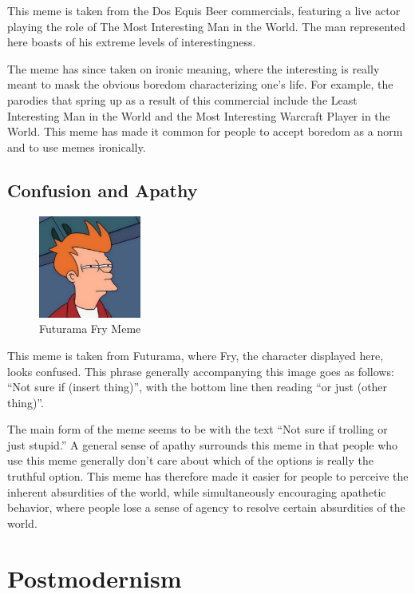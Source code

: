 \documentclass[12pt,letterpaper]{article}
\begin{document}
This meme is taken from the Dos Equis Beer commercials, featuring a live actor playing the role of The Most Interesting Man in the World. The man represented here boasts of his extreme levels of interestingness. 

The meme has since taken on ironic meaning, where the interesting is really meant to mask the obvious boredom characterizing one's life.  For example, the parodies that spring up as a result of this commercial include the Least Interesting Man in the World and the Most Interesting Warcraft Player in the World.  This meme has made it common for people to accept boredom as a norm and to use memes ironically.

\subsection{Confusion and Apathy}

\begin{figure}[!h]
	\centering
	\includegraphics[width=0.3\textwidth]{graphics/8}
	\caption{Futurama Fry Meme}
	\label{5}
\end{figure}

This meme is taken from Futurama, where Fry, the character displayed here, looks confused.  This phrase generally accompanying this image goes as follows: “Not sure if (insert thing)”, with the bottom line then reading “or just (other thing)”. 

The main form of the meme seems to be with the text “Not sure if trolling or just stupid.”  A general sense of apathy surrounds this meme in that people who use this meme generally don't care about which of the options is really the truthful option.  This meme has therefore made it easier for people to perceive the inherent absurdities of the world, while simultaneously encouraging apathetic behavior, where people lose a sense of agency to resolve certain absurdities of the world. 

\section{Postmodernism}
\end{document}

